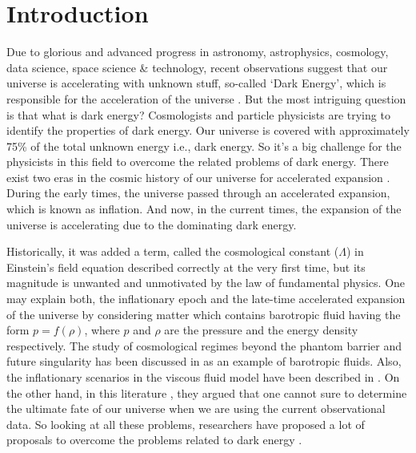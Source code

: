 \documentclass[showpacs,aps,amssymb,preprintnumbers,prd,amsmath,floatfix]{revtex4}
\def \r{\rho}
\begin{document}
\section{Introduction}
Due to glorious and advanced progress in astronomy, astrophysics, cosmology, data science, space science \& technology, recent observations suggest that our universe is accelerating with unknown stuff, so-called `Dark Energy', which is responsible for the acceleration of the universe \cite{Riess1,Perlmutter1,Perlmutter2,Spergel1,Komatsu}. But the most intriguing question is that what is dark energy? Cosmologists and particle physicists are trying to identify the properties of dark energy. Our universe is covered with approximately 75\% of the total unknown energy i.e., dark energy. So it's a big challenge for the physicists in this field to overcome the related problems of dark energy. There exist two eras in the cosmic history of our universe for accelerated expansion \cite{Capoz}. During the early times, the universe passed through an accelerated expansion, which is known as inflation. And now, in the current times, the expansion of the universe is accelerating due to the dominating dark energy.

Historically, it was added a term, called the cosmological constant ($\Lambda$) in Einstein's field equation described correctly at the very first time, but its magnitude is unwanted and unmotivated by the law of fundamental physics. One may explain both, the inflationary epoch and the late-time accelerated expansion of the universe by considering matter which contains barotropic fluid having the form $p=f(\r)$, where $p$ and $\r$ are the pressure and the energy density respectively. The study of cosmological regimes beyond the phantom barrier and future singularity has been discussed in \cite{Nojiri1,Nojiri2} as an example of barotropic fluids. Also, the inflationary scenarios in the viscous fluid model have been described in \cite{Bamba}. On the other hand, in this literature \cite{Astas}, they argued that one cannot sure to determine the ultimate fate of our universe when we are using the current observational data. So looking at all these problems, researchers have proposed a lot of proposals to overcome the problems related to dark energy \cite{Ratra,Caldwell1,Buchert,Picon,Tomita,Milton,Hunt,Easson,Radicella,Pavn,Pandey}. 
\end{document}
